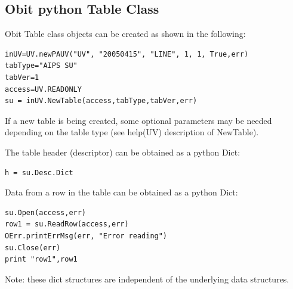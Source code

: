 \documentclass[11pt]{report}
\begin{document}
\subsection{Obit python Table Class}
Obit Table class objects can be created as shown in the following:
\begin{verbatim}
inUV=UV.newPAUV("UV", "20050415", "LINE", 1, 1, True,err)
tabType="AIPS SU"
tabVer=1
access=UV.READONLY
su = inUV.NewTable(access,tabType,tabVer,err)
\end{verbatim}
If a new table is being created, some optional parameters may be needed
depending on the table type (see help(UV) description of NewTable).

The table header (descriptor) can be obtained as a python Dict:
\begin{verbatim}
h = su.Desc.Dict
\end{verbatim}

Data from a row in the table can be obtained as a python Dict:
\begin{verbatim}
su.Open(access,err)
row1 = su.ReadRow(access,err)
OErr.printErrMsg(err, "Error reading")
su.Close(err)
print "row1",row1
\end{verbatim}

Note: these dict structures are independent of the underlying data structures.
\end{document}
